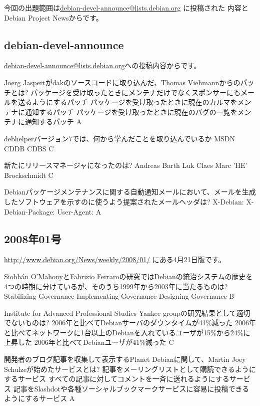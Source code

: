 \documentclass[mingoth,a4paper]{jsarticle}
\begin{document}
今回の出題範囲は\url{debian-devel-announce@lists.debian.org} に投稿された
内容とDebian Project Newsからです。
\begin{multicols}{2}
 
 \subsection{debian-devel-announce}
 \url{debian-devel-announce@lists.debian.org}への投稿内容からです。
 
 \santaku
 {Joerg Jaspertがdakのソースコードに取り込んだ、Thomas Viehmannからのパッチとは?}
 {パッケージを受け取ったときにメンテナだけでなくスポンサーにもメールを送るようにするパッチ}
 {パッケージを受け取ったときに現在のカルマをメンテナに通知するパッチ}
 {パッケージを受け取ったときに現在のバグの一覧をメンテナに通知するパッチ}
 {A}
 
 \santaku
 {debhelperバージョン7では、何から学んだことを取り込んでいるか}
 {MSDN}
 {CDDB}
 {CDBS}
 {C}
 
 \santaku
 {新たにリリースマネージャになったのは?}
 {Andreas Barth}
 {Luk Claes}
 {Marc 'HE' Brockschmidt}
 {C}
 
 \santaku
 {Debianパッケージメンテナンスに関する自動通知メールにおいて、メールを生成したソフトウェアを示すのに使うよう提案されたメールヘッダは?}
 {X-Debian:}
 {X-Debian-Package:}
 {User-Agent:}
 {A}
 
 \subsection{2008年01号}
 \url{http://www.debian.org/News/weekly/2008/01/}
 にある4月21日版です。
 
 \santaku
 {Siobh\'an O'MahonyとFabrizio Ferraroの研究ではDebianの統治システムの歴史を4つの時期に分けているが、そのうち1999年から2003年に当たるものは?}
 {Stabilizing Governance}%
 {Implementing Governance}%
 {Designing Governance}%
 {B}
 
 \santaku
 {Institute for Advanced Professional Studies Yankee groupの研究結果として適切でないものは?}
 {2006年と比べてDebianサーバのダウンタイムが41\%{}減った}
 {2006年と比べてネットワークに1台以上のDebianを入れているユーザが15\%{}から24\%{}に上昇した}
 {2006年と比べてDebianユーザが41\%{}減った}
 {C}
 
 \santaku
 {開発者のブログ記事を収集して表示するPlanet Debianに関して、Martin Joey Schulzeが始めたサービスとは?}
 {記事をメーリングリストとして購読できるようにするサービス}
 {すべての記事に対してコメントを一斉に送れるようにするサービス}
 {記事をSlashdotや各種ソーシャルブックマークサービスに容易に投稿できるようにするサービス}
 {A}
 

\end{multicols}
\end{document}
